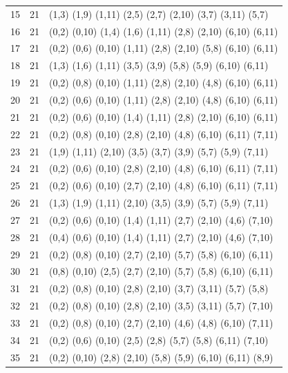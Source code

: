 \begin{appendix}
{\begin{longtable}{lll}
    15 & 21 & (1,3)   (1,9)   (1,11)  (2,5)   (2,7)   (2,10)  (3,7)   (3,11)  (5,7)\\
    16 & 21 & (0,2)   (0,10)  (1,4)   (1,6)   (1,11)  (2,8)   (2,10)  (6,10)  (6,11)\\
    17 & 21 & (0,2)   (0,6)   (0,10)  (1,11)  (2,8)   (2,10)  (5,8)   (6,10)  (6,11)\\
    18 & 21 & (1,3)   (1,6)   (1,11)  (3,5)   (3,9)   (5,8)   (5,9)   (6,10)  (6,11)\\
    19 & 21 & (0,2)   (0,8)   (0,10)  (1,11)  (2,8)   (2,10)  (4,8)   (6,10)  (6,11)\\
    20 & 21 & (0,2)   (0,6)   (0,10)  (1,11)  (2,8)   (2,10)  (4,8)   (6,10)  (6,11)\\
    21 & 21 & (0,2)   (0,6)   (0,10)  (1,4)   (1,11)  (2,8)   (2,10)  (6,10)  (6,11)\\
    22 & 21 & (0,2)   (0,8)   (0,10)  (2,8)   (2,10)  (4,8)   (6,10)  (6,11)  (7,11)\\
    23 & 21 & (1,9)   (1,11)  (2,10)  (3,5)   (3,7)   (3,9)   (5,7)   (5,9)   (7,11)\\
    24 & 21 & (0,2)   (0,6)   (0,10)  (2,8)   (2,10)  (4,8)   (6,10)  (6,11)  (7,11)\\
    25 & 21 & (0,2)   (0,6)   (0,10)  (2,7)   (2,10)  (4,8)   (6,10)  (6,11)  (7,11)\\
    26 & 21 & (1,3)   (1,9)   (1,11)  (2,10)  (3,5)   (3,9)   (5,7)   (5,9)   (7,11)\\
    27 & 21 & (0,2)   (0,6)   (0,10)  (1,4)   (1,11)  (2,7)   (2,10)  (4,6)   (7,10)\\
    28 & 21 & (0,4)   (0,6)   (0,10)  (1,4)   (1,11)  (2,7)   (2,10)  (4,6)   (7,10)\\
    29 & 21 & (0,2)   (0,8)   (0,10)  (2,7)   (2,10)  (5,7)   (5,8)   (6,10)  (6,11)\\
    30 & 21 & (0,8)   (0,10)  (2,5)   (2,7)   (2,10)  (5,7)   (5,8)   (6,10)  (6,11)\\
    31 & 21 & (0,2)   (0,8)   (0,10)  (2,8)   (2,10)  (3,7)   (3,11)  (5,7)   (5,8)\\
    32 & 21 & (0,2)   (0,8)   (0,10)  (2,8)   (2,10)  (3,5)   (3,11)  (5,7)   (7,10)\\
    33 & 21 & (0,2)   (0,8)   (0,10)  (2,7)   (2,10)  (4,6)   (4,8)   (6,10)  (7,11)\\
    34 & 21 & (0,2)   (0,6)   (0,10)  (2,5)   (2,8)   (5,7)   (5,8)   (6,11)  (7,10)\\
    35 & 21 & (0,2)   (0,10)  (2,8)   (2,10)  (5,8)   (5,9)   (6,10)  (6,11)  (8,9)\\

\end{longtable}}
\end{appendix}
